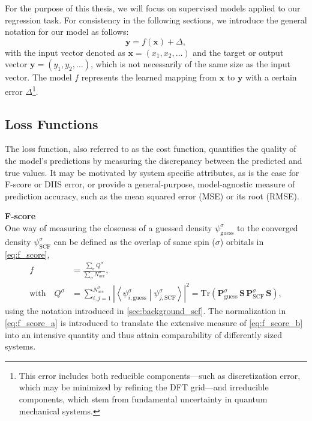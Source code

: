 For the purpose of this thesis, we will focus on supervised models applied to our regression task. For consistency in the following sections, we introduce the general notation for our model as follows:
\begin{equation}
    \label{eq:general_ML_model_formula}
    \mathbf{y} = f(\mathbf{x}) + \Delta,
\end{equation}
with the input vector denoted as $\mathbf{x} = (x_1, x_2, \dots)$ and the target or output vector $\mathbf{y} = (y_1, y_2, \dots)$, which is not necessarily of the same size as the input vector. The model $f$ represents the learned mapping from $\mathbf{x}$ to $\mathbf{y}$ with a certain 
error $\Delta$\footnote{This error includes both reducible components—such as discretization error, which may be minimized by refining the DFT grid—and irreducible components, which stem from fundamental uncertainty in quantum mechanical systems.}. 
\newpage
\subsection{Loss Functions}
\label{subsec:background_loss_function}
The loss function, also referred to as the cost function, quantifies the quality of the model's predictions by measuring the discrepancy between the predicted and true values. It may be motivated by system specific attributes, as is the case for F-score or DIIS error, or provide a general-purpose, model-agnostic measure of prediction accuracy, such as the mean squared error (MSE) or its root (RMSE). 

\textbf{F-score}\\
One way of measuring the closeness of a guessed density $\psi^\sigma_{\text{guess}}$ to the converged density $\psi^\sigma_{\text{SCF}}$ can be defined as the overlap of same spin ($\sigma$) orbitals in \autoref{eq:f_score},
\begin{subequations}
\label{eq:f_score}
\begin{align}
    f &= \frac{\sum\limits_\sigma Q^\sigma}{\sum\limits_\sigma N^\sigma_\text{occ}}, \label{eq:f_score_a}\\
    \text{with} \quad Q^\sigma &= \sum_{i,j=1}^{N^\sigma_\text{occ}} \left| \left\langle \psi^\sigma_{i,\text{guess}} \middle| \psi^\sigma_{j,\text{SCF}} \right\rangle \right|^2 = \mathrm{Tr}\left( \mathbf{P}^{\sigma}_\text{guess} \, \mathbf{S} \, \mathbf{P}^{\sigma}_\text{SCF} \, \mathbf{S} \right),  \label{eq:f_score_b}
\end{align}
\end{subequations}
using the notation introduced in \autoref{sec:background_scf}. The normalization in \autoref{eq:f_score_a} is introduced to translate the extensive measure of \autoref{eq:f_score_b} into an intensive quantity and thus attain comparability of differently sized systems.


